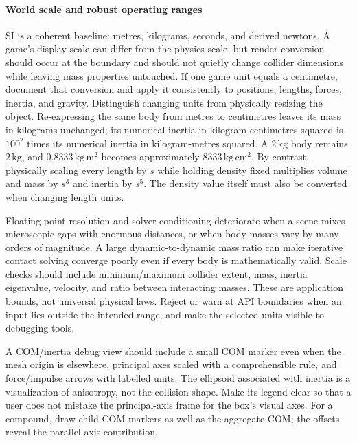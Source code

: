 \paragraph{World scale and robust operating ranges}\label{world-scale-and-robust-operating-ranges}

SI is a coherent baseline: metres, kilograms, seconds, and derived newtons. A game's display scale can differ from the physics scale, but render conversion should occur at the boundary and should not quietly change collider dimensions while leaving mass properties untouched. If one game unit equals a centimetre, document that conversion and apply it consistently to positions, lengths, forces, inertia, and gravity. Distinguish changing units from physically resizing the object. Re-expressing the same body from metres to centimetres leaves its mass in kilograms unchanged; its numerical inertia in kilogram-centimetres squared is \(100^2\) times its numerical inertia in kilogram-metres squared. A \(2\,\mathrm{kg}\) body remains \(2\,\mathrm{kg}\), and \(0.8333\,\mathrm{kg\,m^2}\) becomes approximately \(8333\,\mathrm{kg\,cm^2}\). By contrast, physically scaling every length by \(s\) while holding density fixed multiplies volume and mass by \(s^3\) and inertia by \(s^5\). The density value itself must also be converted when changing length units.

Floating-point resolution and solver conditioning deteriorate when a scene mixes microscopic gaps with enormous distances, or when body masses vary by many orders of magnitude. A large dynamic-to-dynamic mass ratio can make iterative contact solving converge poorly even if every body is mathematically valid. Scale checks should include minimum/maximum collider extent, mass, inertia eigenvalue, velocity, and ratio between interacting masses. These are application bounds, not universal physical laws. Reject or warn at API boundaries when an input lies outside the intended range, and make the selected units visible to debugging tools.

A COM/inertia debug view should include a small COM marker even when the mesh origin is elsewhere, principal axes scaled with a comprehensible rule, and force/impulse arrows with labelled units. The ellipsoid associated with inertia is a visualization of anisotropy, not the collision shape. Make its legend clear so that a user does not mistake the principal-axis frame for the box's visual axes. For a compound, draw child COM markers as well as the aggregate COM; the offsets reveal the parallel-axis contribution.

